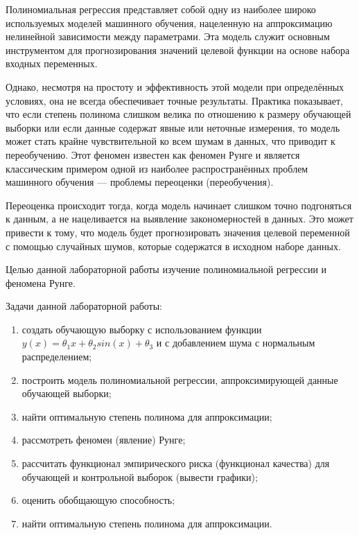 
Полиномиальная регрессия представляет собой одну из наиболее широко используемых моделей машинного обучения, нацеленную на аппроксимацию нелинейной зависимости между параметрами. Эта модель служит основным инструментом для прогнозирования значений целевой функции на основе набора входных переменных.

Однако, несмотря на простоту и эффективность этой модели при определённых условиях, она не всегда обеспечивает точные результаты. Практика показывает, что если степень полинома слишком велика по отношению к размеру обучающей выборки или если данные содержат явные или неточные измерения, то модель может стать крайне чувствительной ко всем шумам в данных, что приводит к переобучению. Этот феномен известен как феномен Рунге и является классическим примером одной 
из наиболее распространённых проблем машинного обучения — проблемы переоценки (переобучения).

Переоценка происходит тогда, когда модель начинает слишком точно подгоняться к данным, а не нацеливается на выявление закономерностей в данных. Это может привести к тому, что модель будет прогнозировать значения целевой переменной с помощью случайных шумов, которые содержатся в исходном наборе данных.

Целью данной лабораторной работы изучение полиномиальной регрессии и феномена Рунге.

Задачи данной лабораторной работы:
\begin{enumerate}[label*=\arabic*)]
	\item создать обучающую выборку с использованием функции $y(x)=\theta_1x+\theta_2sin(x)+\theta_3$ и с добавлением шума с нормальным распределением;
	\item построить модель полиномиальной регрессии, аппроксимирующей данные обучающей выборки;
	\item найти оптимальную степень полинома для аппроксимации;
	\item рассмотреть феномен (явление) Рунге;
	\item рассчитать функционал эмпирического риска (функционал качества) для обучающей и контрольной выборок (вывести графики);
	\item оценить обобщающую способность;
	\item найти оптимальную степень полинома для аппроксимации.
\end{enumerate}

\clearpage
